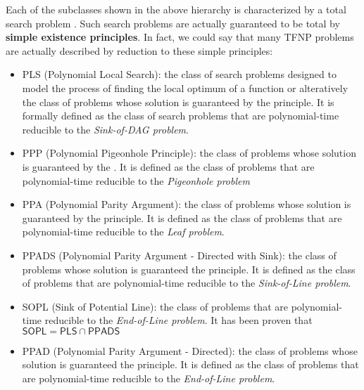 Each of the subclasses shown in the above hierarchy is characterized by a total search problem \cite{proofs_circuits_communication,tfnp_characterization}. Such search problems are actually guaranteed to be total by \textbf{simple existence principles}. In fact, we could say that many \textsf{TFNP} problems are actually described by reduction to these simple principles:
\begin{itemize}
    \item \textsf{PLS} (Polynomial Local Search): the class of search problems designed to model the process of finding the local optimum of a function or alteratively the class of problems whose solution is guaranteed by the  principle. It is formally defined as the class of search problems that are polynomial-time reducible to the \textit{Sink-of-DAG problem}.
    
    \item \textsf{PPP} (Polynomial Pigeonhole Principle): the class of problems whose solution is guaranteed by the . It is defined as the class of problems that are polynomial-time reducible to the \textit{Pigeonhole problem}
    
    \item \textsf{PPA} (Polynomial Parity Argument): the class of problems whose solution is guaranteed by the  principle. It is defined as the class of problems that are polynomial-time reducible to the \textit{Leaf problem}.
    
    \item \textsf{PPADS} (Polynomial Parity Argument - Directed with Sink): the class of problems whose solution is guaranteed the  principle. It is defined as the class of problems that are polynomial-time reducible to the \textit{Sink-of-Line problem}.
    
    \item \textsf{SOPL} (Sink of Potential Line): the class of problems that are polynomial-time reducible to the \textit{End-of-Line problem}. It has been proven that $\mathsf{SOPL} = \mathsf{PLS} \cap \mathsf{PPADS}$ \cite{Further_collapses_TFNP}
    
    \item \textsf{PPAD} (Polynomial Parity Argument - Directed): the class of problems whose solution is guaranteed the  principle. It is defined as the class of problems that are polynomial-time reducible to the \textit{End-of-Line problem}.
    

\end{itemize}

